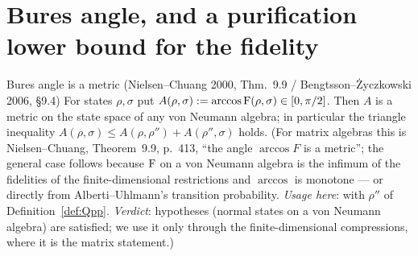 \documentclass[11pt]{article}
\begin{document}
\section{Bures angle, and a purification lower bound for the fidelity}\label{sec:triangle}

\begin{citedbox}{Bures angle is a metric (Nielsen--Chuang 2000, Thm.~9.9 / Bengtsson--\.Zyczkowski 2006, \S9.4)}
For states $\rho,\sigma$ put $A(\rho,\sigma):=\arccos\operatorname{F}(\rho,\sigma)\in[0,\pi/2]$.  Then $A$ is a
metric on the state space of any von Neumann algebra; in particular the triangle inequality
$A(\rho,\sigma)\le A(\rho,\rho'')+A(\rho'',\sigma)$ holds.  (For matrix algebras this is
Nielsen--Chuang, Theorem~9.9, p.~413, ``the angle $\arccos F$ is a metric''; the general case follows
because $\operatorname{F}$ on a von Neumann algebra is the infimum of the fidelities of the finite-dimensional
restrictions and $\arccos$ is monotone --- or directly from Alberti--Uhlmann's transition probability.
\emph{Usage here}: with $\rho''$ of Definition~\ref{def:Qpp}.  \emph{Verdict}: hypotheses (normal
states on a von Neumann algebra) are satisfied; we use it only through the finite-dimensional
compressions, where it is the matrix statement.)
\end{citedbox}
\end{document}
